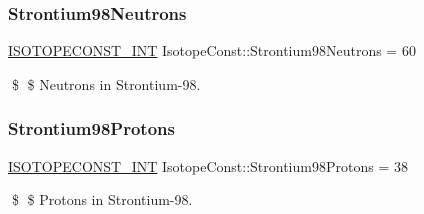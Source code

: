 \subsubsection{\texorpdfstring{Strontium98\+Neutrons}{Strontium98Neutrons}}
{\footnotesize\ttfamily \mbox{\hyperlink{group___isotope_const-_macros_ga5f18360b3e99483a35c32d789e62621c}{I\+S\+O\+T\+O\+P\+E\+C\+O\+N\+S\+T\+\_\+\+I\+NT}} Isotope\+Const\+::\+Strontium98\+Neutrons = 60}

\$ \$ Neutrons in Strontium-\/98. \mbox{\label{group___isotope_const-_strontium-_sr98_gaf0820f6f3fdb77f039a3033dd5ffedb0}} 
\subsubsection{\texorpdfstring{Strontium98\+Protons}{Strontium98Protons}}
{\footnotesize\ttfamily \mbox{\hyperlink{group___isotope_const-_macros_ga5f18360b3e99483a35c32d789e62621c}{I\+S\+O\+T\+O\+P\+E\+C\+O\+N\+S\+T\+\_\+\+I\+NT}} Isotope\+Const\+::\+Strontium98\+Protons = 38}

\$ \$ Protons in Strontium-\/98. 
